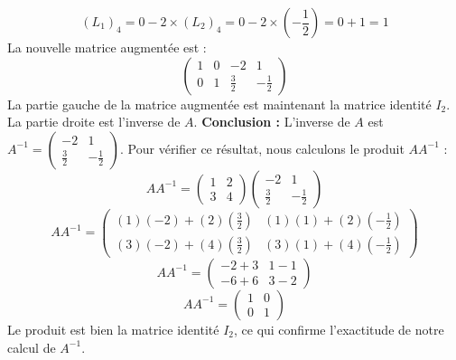 \documentclass[12pt,a4paper]{report}
\begin{document}
            $$(L_1)_{4} = 0 - 2 \times (L_2)_{4} = 0 - 2 \times (-\frac{1}{2}) = 0 + 1 = 1$$
            La nouvelle matrice augmentée est :
            $$\left( \begin{array}{cc|cc} 1 & 0 & -2 & 1 \\ 0 & 1 & \frac{3}{2} & -\frac{1}{2} \end{array} \right)$$
        La partie gauche de la matrice augmentée est maintenant la matrice identité $I_2$. La partie droite est l'inverse de $A$.
\textbf{Conclusion :} L'inverse de $A$ est $A^{-1} = \begin{pmatrix} -2 & 1 \\ \frac{3}{2} & -\frac{1}{2} \end{pmatrix}$.
Pour vérifier ce résultat, nous calculons le produit $A A^{-1}$ :
$$A A^{-1} = \begin{pmatrix} 1 & 2 \\ 3 & 4 \end{pmatrix} \begin{pmatrix} -2 & 1 \\ \frac{3}{2} & -\frac{1}{2} \end{pmatrix}$$
$$A A^{-1} = \begin{pmatrix} (1)(-2) + (2)(\frac{3}{2}) & (1)(1) + (2)(-\frac{1}{2}) \\ (3)(-2) + (4)(\frac{3}{2}) & (3)(1) + (4)(-\frac{1}{2}) \end{pmatrix}$$
$$A A^{-1} = \begin{pmatrix} -2 + 3 & 1 - 1 \\ -6 + 6 & 3 - 2 \end{pmatrix}$$
$$A A^{-1} = \begin{pmatrix} 1 & 0 \\ 0 & 1 \end{pmatrix}$$
Le produit est bien la matrice identité $I_2$, ce qui confirme l'exactitude de notre calcul de $A^{-1}$.
\end{document}
